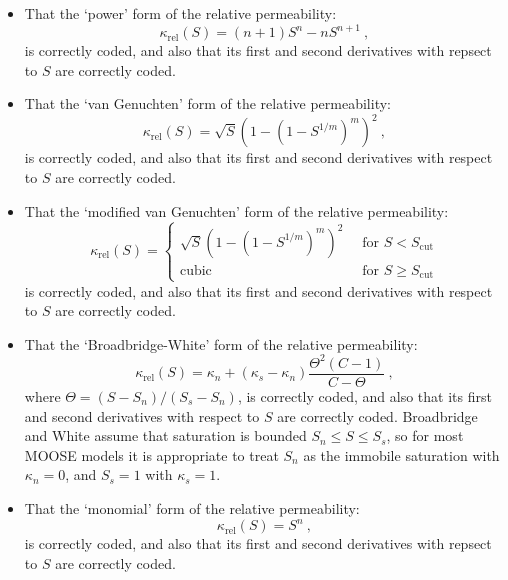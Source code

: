 \documentclass[]{scrreprt}
\begin{document}
\begin{itemize}

\item That the `power' form of the relative permeability:
\begin{equation}
\kappa_{\mathrm{rel}}(S) = (n+1)S^{n} - nS^{n+1} \ ,
\end{equation}
is correctly coded, and also that its first and second derivatives
with repsect to $S$ are correctly coded.

\item That the `van Genuchten' form of the relative permeability:
\begin{equation}
\kappa_{\mathrm{rel}}(S) = \sqrt{S}\left(1 - \left(1 -
S^{1/m}\right)^{m}\right)^{2} \ ,
\end{equation}
is correctly coded, and also that its first and second derivatives
with respect to $S$ are correctly coded.

\item That the `modified van Genuchten' form of the relative permeability:
\begin{equation}
\kappa_{\mathrm{rel}}(S) = \left\{
\begin{array}{ll}
\sqrt{S}\left(1 - \left(1 -
S^{1/m}\right)^{m}\right)^{2} \ & \mbox{ for } S<S_{\mathrm{cut}} \\
\mbox{cubic} \ & \mbox{ for } S \geq S_{\mathrm{cut}}
\end{array}
\right.
\end{equation}
is correctly coded, and also that its first and second derivatives
with respect to $S$ are correctly coded.

\item That the `Broadbridge-White' form of the relative permeability:
\begin{equation}
\kappa_{\mathrm{rel}}(S) = \kappa_{n} +
(\kappa_{s}-\kappa_{n})\frac{\Theta^{2}(C-1)}{C-\Theta} \ ,
\label{bw.krel}
\end{equation}
where $\Theta = (S-S_{n})/(S_{s}-S_{n})$, 
is correctly coded, and also that its first and second derivatives
with respect to $S$ are correctly coded.  Broadbridge and White assume
that saturation is bounded $S_{n}\leq S\leq S_{s}$, so for most MOOSE
models it is appropriate to treat $S_{n}$ as the immobile saturation
with $\kappa_{n}=0$, and $S_{s}=1$ with $\kappa_{s}=1$.

\item That the `monomial' form of the relative permeability:
\begin{equation}
\kappa_{\mathrm{rel}}(S) = S^{n} \ ,
\end{equation}
is correctly coded, and also that its first and second derivatives
with repsect to $S$ are correctly coded.


\end{itemize}
\end{document}
